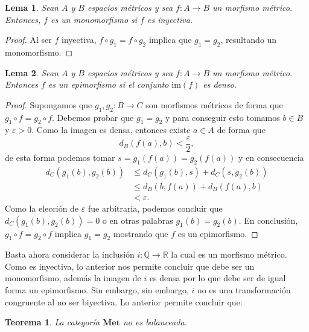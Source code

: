 \documentclass[draft,letter,10pt,notitlepage]{amsart}
\newtheorem{theorem}{Teorema}
\newtheorem{lemma}{Lema}
\theoremstyle{definition}
\theoremstyle{remark}
\begin{document}
\begin{lemma}
  Sean \( A\) y \( B\) espacios métricos y sea \( f \colon A \to B\)
  un morfismo métrico. Entonces, \( f\) es un monomorfismo si
  \( f\) es inyectiva.
\end{lemma}
\begin{proof}
  Al ser \( f\) inyectiva, \( f \circ g_1 = f \circ g_2\) implica
  que \( g_1 = g_2\), resultando un monomorfismo.
\end{proof}

\begin{lemma}
  Sean \( A\) y \( B\) espacios métricos y sea \( f \colon A \to B\)
  un morfismo métrico. Entonces \( f\) es un epimorfismo si
  el conjunto \( \mathrm{im}(f)\) es denso.
\end{lemma}
\begin{proof}
  Supongamos que \( g_1,g_2 \colon B \to C\) son morfismos métricos de forma
  que \( g_1 \circ f = g_2 \circ f\). Debemos probar que \( g_1 = g_2\) y
  para conseguir esto tomamos \( b \in B\) y \( \varepsilon>0\). Como
  la imagen es densa, entonces existe \( a \in A\) de forma que
  \[ d_B(f(a),b) < \frac{\varepsilon}{2},\]
  de esta forma podemos tomar \( s = g_1(f(a)) = g_2(f(a))\) y en
  consecuencia
  \begin{align*}
    d_C(g_1(b),g_2(b)) &\leq d_C(g_1(b), s) + d_C(s,g_2(b)) \\
    &\leq d_B(b,f(a)) + d_B(f(a),b) \\
    &< \varepsilon.
  \end{align*}
  Como la elección de \( \varepsilon\) fue arbitraria, podemos
  concluir que \( d_C(g_1(b),g_2(b)) = 0\) o en otras palabras
  \( g_1(b) = g_2(b)\). En conclusión, \( g_1 \circ f = g_2 \circ f\)
  implica \( g_1 = g_2\) mostrando que \( f\) es un epimorfismo.
\end{proof}

Basta ahora considerar la inclusión \( i \colon \mathbb{Q} \to \mathbb{R}\)
la cual es un morfismo métrico. Como es inyectiva, lo anterior nos
permite concluir que debe ser un monomorfismo, además la imagen de \( i\)
es densa por lo que debe ser de igual forma un epimorfismo.  Sin embargo,
sin embargo, \( i\) no es una transformación congruente al no ser biyectiva.
Lo anterior permite concluir que:


\begin{theorem}
  La categoría \( \mathbf{Met}\) no es balanceada.
\end{theorem}
\end{document}
